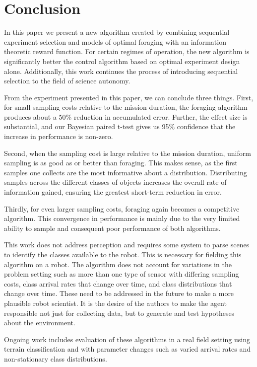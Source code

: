 \section{Conclusion}
\label{sec:conclusion}

In this paper we present a new algorithm created by combining sequential experiment selection and models of optimal foraging with an information theoretic reward function.  For certain regimes of operation, the new algorithm is significantly better the control algorithm based on optimal experiment design alone.  Additionally, this work continues the process of introducing sequential selection to the field of science autonomy.  

From the experiment presented in this paper, we can conclude three things.  First, for small sampling costs relative to the mission duration, the foraging algorithm produces about a 50\% reduction in accumulated error.  Further, the effect size is substantial, and our Bayesian paired t-test gives us 95\% confidence that the increase in performance is non-zero.

Second, when the sampling cost is large relative to the mission duration, uniform sampling is as good as or better than foraging.  This makes sense, as the first samples one collects are the most informative about a distribution.  Distributing samples across the different classes of objects increases the overall rate of information gained, ensuring the greatest short-term reduction in error.

Thirdly, for even larger sampling costs, foraging again becomes a competitive algorithm.  This convergence in performance is mainly due to the very limited ability to sample and consequent poor performance of both algorithms.  

This work does not address perception and requires some system to parse scenes to identify the classes available to the robot.  This is necessary for fielding this algorithm on a robot.  The algorithm does not account for variations in the problem setting such as more than one type of sensor with differing sampling costs, class arrival rates that change over time, and class distributions that change over time.  These need to be addressed in the future to make a more plausible robot scientist.  It is the desire of the authors to make the agent responsible not just for collecting data, but to generate and test hypotheses about the environment.

Ongoing work includes evaluation of these algorithms in a real field setting using terrain classification and with parameter changes such as varied arrival rates and non-stationary class distributions.
% 
% 
% 
% 
% 




